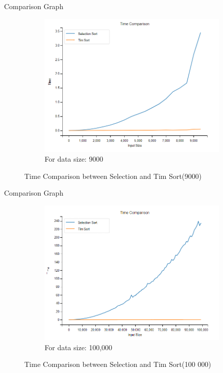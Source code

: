\documentclass[aspectratio=169]{beamer}
\begin{document}
    \begin{frame}{Comparison Graph}
    
        
    
        \begin{figure}
    \centering
    \begin{subfigure}{\textwidth}
		\includegraphics[scale=0.25]{Images/9k_time_comp.png}
		\caption{For data size: 9000}
		\label{d9k}
	\end{subfigure}
        \caption{Time Comparison between Selection and Tim Sort(9000)}
        \end{figure}
       
    \end{frame}

    \begin{frame}{Comparison Graph}
    \begin{figure}[h]
    \centering
    \begin{subfigure}{\textwidth}
		\includegraphics[scale=0.25]{Images/100k_time_comp.png}
		\caption{For data size: 100,000}
		\label{d100k}
	\end{subfigure}
        \caption{Time Comparison between Selection and Tim Sort(100 000)}
        \end{figure}    
    \end{frame}
\end{document}
